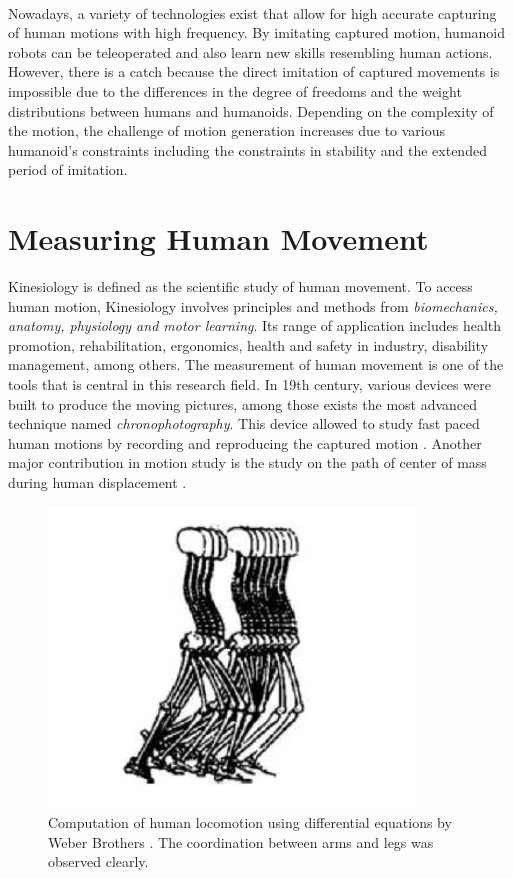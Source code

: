 ~

Nowadays, a variety of technologies exist that allow for high accurate capturing of human motions with high frequency. 
By imitating captured motion, humanoid robots can be teleoperated and also learn new skills resembling human actions. 
However, there is a catch because the direct imitation of captured movements is impossible due to the differences in 
the degree of freedoms and the weight distributions between humans and humanoids. Depending on the complexity of the 
motion, the challenge of motion generation increases due to various humanoid's constraints including the constraints in 
stability and the extended period of imitation. 

\section{Measuring Human Movement}

Kinesiology is defined as the scientific study of human movement. To access human motion, Kinesiology involves principles
and methods from \textit{biomechanics, anatomy, physiology and motor learning}. Its range of application includes health
promotion, rehabilitation, ergonomics, health and safety in industry, disability management, among others. The 
measurement of human movement is one of the tools that is central in this research field. In 19th century, various 
devices were built to produce the moving pictures, among those exists the most advanced technique named 
\textit{chronophotography}. This device allowed to study fast paced human motions by recording and reproducing the 
captured motion \cite{RosenhahnBodo2008HMUM}. Another major contribution in motion study is the study on the path of 
center of mass during human displacement \cite{alma991010593879705596}.

\begin{figure}[h!]
\centering
\includegraphics[scale=0.4]{images/intro-2.png}\hfill
\caption[Human Locomotion using Differential Equations]{Computation of human locomotion using differential equations by Weber Brothers \cite{alma991010593879705596}. The coordination between arms and legs was observed clearly.}\hfill
\label{motion-coordination}
\end{figure}

